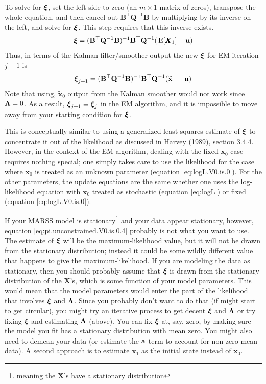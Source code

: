 \documentclass[]{article}
\def\xixi{\mbox{\boldmath $\xi$}}
\def\LAM{\mbox{\boldmath $\Lambda$}}
\def\UPS{\mbox{\boldmath $\Upsilon$}}
\def\BB{\mbox{$\mathbf B$}}	\def\bb{\mbox{$\mathbf b$}} \def\Bb{\mbox{$\mathbf J$}} \def\Ba{\mbox{$\mathbf L$}} \def\Bm{\UPS}
\def\E{\,\textup{\textrm{E}}}
\def\QQ{\mbox{$\mathbf Q$}}	 \def\qq{\mbox{$\mathbf q$}} \def\Qb{\mbox{$\mathbf G$}}  \def\Qm{\mathbb{Q}}
\def\XX{\mbox{$\pmb{X}$}}	\def\xx{\mbox{$\pmb{x}$}}
\begin{document}
To solve for $\xixi$, set the left side to zero (an $m \times 1$ matrix of zeros), transpose the whole equation, and then cancel out $\BB^\top\QQ^{-1}\BB$ by multiplying by its inverse on the left, and solve for $\xixi$.  This step requires that this inverse exists.
\begin{equation}\label{eq:pi.unconstrained.V0.is.0.4}
\begin{split}
\xixi = (\BB^\top\QQ^{-1}\BB)^{-1}\BB^\top\QQ^{-1}(\E[\XX_1]  - \uu) 
\end{split}
\end{equation}
Thus, in terms of the Kalman filter/smoother output the new $\xixi$ for EM iteration $j+1$ is
\begin{equation}\label{eq:pi.unconstrained.V0.is.0.5}
\begin{split}
\xixi_{j+1} = (\BB^\top\QQ^{-1}\BB)^{-1}\BB^\top\QQ^{-1}(\widetilde{\mbox{$\mathbf x$}}_1  - \uu) 
\end{split}
\end{equation}
Note that using, $\widetilde{\mbox{$\mathbf x$}}_0$ output from the Kalman smoother would not work since $\LAM=0$.  As a result, $\xixi_{j+1} \equiv \xixi_j$ in the EM algorithm, and it is impossible to move away from your starting condition for $\xixi$.

This is conceptually similar to using a generalized least squares estimate of $\xixi$ to concentrate it out of the likelihood as discussed in Harvey (1989), section 3.4.4.  However, in the context of the EM algorithm, dealing with the fixed $\xx_0$ case requires nothing special; one simply takes care to use the likelihood for the case where $\xx_0$ is treated as an unknown parameter (equation \ref{eq:logL.V0.is.0}).  For the other parameters, the update equations are the same whether one uses the log-likelihood equation with $\xx_0$ treated as stochastic (equation \ref{eq:logL}) or fixed (equation \ref{eq:logL.V0.is.0}).

If your MARSS model is stationary\footnote{meaning the $\XX$'s have a stationary distribution} and your data appear stationary, however, equation \ref{eq:pi.unconstrained.V0.is.0.4} probably is not what you want to use.  The estimate of $\xixi$ will be the maximum-likelihood value, but it will not be drawn from the stationary distribution; instead it could be some wildly different value that happens to give the maximum-likelihood.  If you are modeling the data as stationary, then you should probably assume that $\xixi$ is drawn from the stationary distribution of the $\XX$'s, which is some function of your model parameters.  This would mean that the model parameters would enter the part of the likelihood that involves $\xixi$ and $\LAM$. Since you probably don't want to do that (if might start to get circular), you might try an iterative process to get decent $\xixi$ and $\LAM$ or try fixing $\xixi$ and estimating $\LAM$ (above).  You can fix $\xixi$ at, say, zero, by making sure the model you fit has a stationary distribution with mean zero.  You might also need to demean your data (or estimate the $\aa$ term to account for non-zero mean data).  A second approach is to estimate $\xx_1$ as the initial state instead of $\xx_0$.
\end{document}
